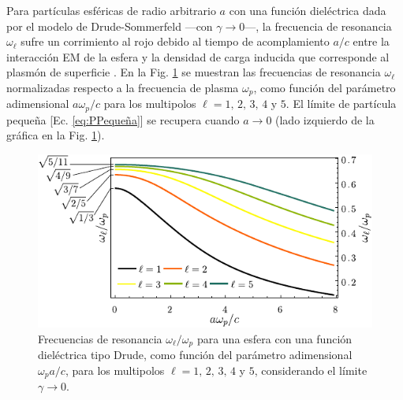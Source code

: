 Para partículas esféricas de radio arbitrario $a$ con una función dieléctrica dada por el modelo de Drude-Sommerfeld ---con $\gamma\to 0$---, la frecuencia de resonancia $\omega_\ell$ sufre un corrimiento al rojo debido al tiempo de acomplamiento $a/c$ entre la interacción EM de la esfera y  la densidad de carga inducida que corresponde al plasmón de superficie \cite{aizpurua1998coupling}.  En la Fig.  \ref{fig:NormalModes} se muestran las frecuencias de resonancia $\omega_\ell$ normalizadas respecto a la frecuencia de plasma $\omega_p$, como función del parámetro adimensional $a\omega_p / c$ para los multipolos $\ell = 1,\,2,\,3,\,4$ y $5$. El límite de partícula pequeña [Ec.  \eqref{eq:PPequeña}]	se recupera cuando  $a\to 0$ (lado izquierdo de la gráfica en la Fig.  \ref{fig:NormalModes}).  

	\begin{figure}[h!]\centering
		\includegraphics[scale=1.15]{1-Teoria/figs/1-4-DrudeMultipoles.pdf}\vspace*{-1em}
	\caption{Frecuencias de resonancia $\omega_\ell/\omega_p$ para una esfera con una función dieléctrica tipo Drude, como función del parámetro adimensional  $\omega_p a / c$, para los multipolos $\ell = 1,\,2,\,3,\,4$ y $5$, considerando el límite $\gamma\to 0$. }
	\label{fig:NormalModes}
	\end{figure}		

